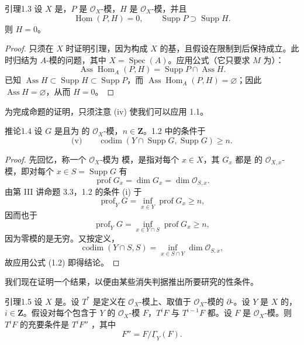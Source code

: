 \begin{SGAresult}{引理}{1.3}
设 $X$ 是，$P$ 是 $\mathscr O_X$-模，$H$ 是 $\mathscr O_X$-模，并且
\[\underline{\operatorname{Hom}}(P,H)=0,\qquad\operatorname{Supp}P\supset\operatorname{Supp}H.\]
则 $H=0$。
\end{SGAresult}
\begin{proof}
只须在 $X$ 时证明引理，因为构成 $X$ 的基，且假设在限制到后保持成立。此时归结为 $A$-模的问题，其中 $X=\operatorname{Spec}(A)$。应用公式（它只要求 $M$ 为）：
\[\operatorname{Ass}\operatorname{Hom}_A(P,H)=\operatorname{Supp}P\cap\operatorname{Ass}H.\]
已知 $\operatorname{Ass}H\subset\operatorname{Supp}H\subset\operatorname{Supp}P$，而 $\operatorname{Ass}\operatorname{Hom}_A(P,H)=\varnothing$；因此 $\operatorname{Ass}H=\varnothing$，从而 $H=0$。
\end{proof}
为完成命题的证明，只须注意 (iv) 使我们可以应用 1.1。
\begin{SGAresult}{推论}{1.4}
设 $G$ 是且为  的 $\mathscr O_X$-模，$n\in\mathbf Z$。1.2 中的条件于
\[\text{(v)}\qquad\operatorname{codim}(Y\cap\operatorname{Supp}G,\operatorname{Supp}G)\geq n.\]
\end{SGAresult}
\begin{proof}
先回忆，称一个 $\mathscr O_X$-模为  模，是指对每个 $x\in X$，其 $G_x$ 都是  的 $\mathscr O_{X,x}$-模，即对每个 $x\in S=\operatorname{Supp}G$ 有
\[\operatorname{prof}G_x=\dim G_x=\dim\mathscr O_{S,x}.\tag{1.2}\]
由第 III 讲命题 3.3，1.2 的条件 (i) 于
\[\operatorname{prof}_YG=\inf_{x\in Y}\operatorname{prof}G_x\geq n,\tag{1.3}\]
因而也于
\[\operatorname{prof}_YG=\inf_{x\in Y\cap S}\operatorname{prof}G_x\geq n,\]
因为零模的是无穷。又按定义，
\[\operatorname{codim}(Y\cap S,S)=\inf_{x\in S\cap Y}\dim\mathscr O_{S,x},\]
故应用公式 (1.2) 即得结论。
\end{proof}
我们现在证明一个结果，以便由某些消失判据推出所要研究的性条件。
\begin{SGAresult}{引理}{1.5}
设 $X$ 是。设 $T^*$ 是定义在 $\mathscr O_X$-模上、取值于 $\mathscr O_X$-模的 $\partial$-。设 $Y$ 是 $X$ 的，$i\in\mathbf Z$。假设对每个包含于 $Y$ 的 $\mathscr O_X$-模 $F$，$T^iF$ 与 $T^{i-1}F$ 都。设 $F$ 是 $\mathscr O_X$-模。则 $T^iF$ 的充要条件是 $T^iF''$ ，其中
\[F''=F/\underline\Gamma_Y(F).\]
\end{SGAresult}

